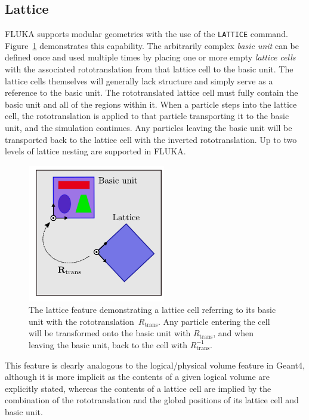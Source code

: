 \documentclass[preprint,12pt]{elsarticle}
\newcommand{\fluka}[1]{\texttt{\MakeUppercase{#1}}}
\begin{document}
\subsection{Lattice}

FLUKA supports modular geometries with the use of the \fluka{lattice}
command. Figure~\ref{fig:lattice} demonstrates this capability. The
arbitrarily complex \emph{basic unit} can be defined once and used
multiple times by placing one or more empty \emph{lattice cells} with the
associated rototranslation from that lattice cell to the basic
unit. The lattice cells themselves will generally lack structure
and simply serve as a reference to the basic unit. The rototranslated
lattice cell must fully contain the basic unit and all of the regions
within it. When a particle steps into the lattice cell, the
rototranslation is applied to that particle transporting it to the
basic unit, and the simulation continues. Any
particles leaving the basic unit will be transported back to the
lattice cell with the inverted rototranslation. Up to two
levels of lattice nesting are supported in FLUKA.

\begin{figure}[hbtp]
\begin{center}
\includegraphics[width=6cm]{lattice}
\caption{The lattice feature demonstrating a lattice cell
  referring to its basic unit with the rototranslation~$R_\textrm{trans}$.
  Any particle entering the cell will be transformed onto the basic unit
  with $R_\textrm{trans}$, and when leaving the basic unit, back to the cell
  with $R_\textrm{trans}^{-1}$.}
\label{fig:lattice}
\end{center}
\end{figure}
This feature is clearly analogous to the logical/physical volume feature in
Geant4, although it is more implicit as the contents of a given logical
volume are explicitly stated, whereas the contents of a lattice cell
are implied by the combination of the rototranslation and the global positions of
its lattice cell and basic unit.
\end{document}

